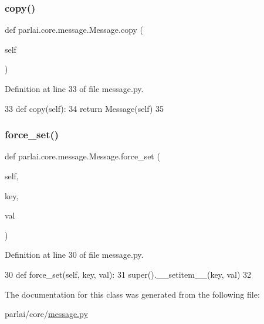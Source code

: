 \subsubsection{\texorpdfstring{copy()}{copy()}}
{\footnotesize\ttfamily def parlai.\+core.\+message.\+Message.\+copy (\begin{DoxyParamCaption}\item[{}]{self }\end{DoxyParamCaption})}



Definition at line 33 of file message.\+py.


\begin{DoxyCode}
33     \textcolor{keyword}{def }copy(self):
34         \textcolor{keywordflow}{return} Message(self)
35 \end{DoxyCode}
\mbox{\label{classparlai_1_1core_1_1message_1_1Message_acbafaa2540a6b2ca6513fe9db49a9291}} 
\subsubsection{\texorpdfstring{force\+\_\+set()}{force\_set()}}
{\footnotesize\ttfamily def parlai.\+core.\+message.\+Message.\+force\+\_\+set (\begin{DoxyParamCaption}\item[{}]{self,  }\item[{}]{key,  }\item[{}]{val }\end{DoxyParamCaption})}



Definition at line 30 of file message.\+py.


\begin{DoxyCode}
30     \textcolor{keyword}{def }force\_set(self, key, val):
31         super().\_\_setitem\_\_(key, val)
32 
\end{DoxyCode}


The documentation for this class was generated from the following file\+:\begin{DoxyCompactItemize}
\item 
parlai/core/\hyperlink{message_8py}{message.\+py}\end{DoxyCompactItemize}
